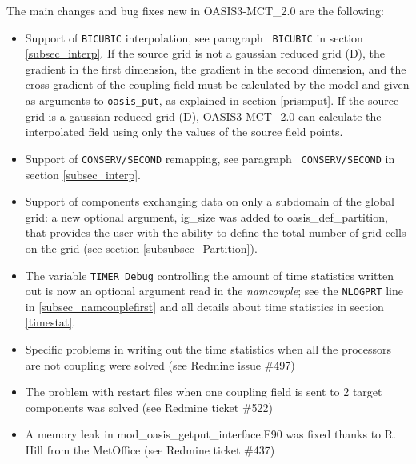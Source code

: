 The main changes and bug fixes new in OASIS3-MCT\_2.0 are the
following:
\begin{itemize}

\item Support of {\tt BICUBIC} interpolation, see paragraph {\tt
    BICUBIC} in section \ref{subsec_interp}. If the source grid
    is not a gaussian reduced grid (D), the gradient in the first dimension, 
    the gradient in the second dimension, and the cross-gradient 
    of the coupling field must be calculated by the model and 
    given as arguments to {\tt oasis\_put}, as explained in section \ref{prismput}.
    If the source grid is a gaussian reduced grid (D), OASIS3-MCT\_2.0 
    can calculate the interpolated field using only the values of the source
    field points.

\item Support of {\tt CONSERV/SECOND} remapping, see paragraph {\tt
    CONSERV/SECOND} in section \ref{subsec_interp}.

\item Support of components exchanging data on only a subdomain of the
  global grid: a new optional argument, ig\_size was added to
  oasis\_def\_partition, that provides the user with the ability to
  define the total number of grid cells on the grid (see section
  \ref{subsubsec_Partition}).


\item The variable {\tt TIMER\_Debug} controlling the amount of time
  statistics written out is now an optional argument read in the {\it
    namcouple}; see the {\tt NLOGPRT} line in
  \ref{subsec_namcouplefirst} and all details about time statistics in
  section \ref{timestat}.

\item Specific problems in writing out the time statistics when all
  the processors are not coupling were solved (see Redmine issue
  \#497)

\item The problem with restart files when one coupling field is sent
  to 2 target components was solved (see Redmine ticket \#522)

\item A memory leak in mod\_oasis\_getput\_interface.F90 was fixed
  thanks to R. Hill from the MetOffice (see Redmine ticket \#437)


\end{itemize}
